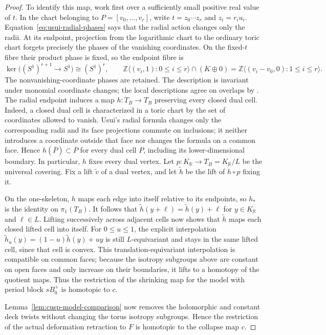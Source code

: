 \begin{proof}
To identify this map, work first over a sufficiently small positive real
value of $t$.  In the chart belonging to
$P=[v_0,\ldots,v_r]$, write $t=z_0\cdots z_r$ and
$z_i=r_iu_i$.  Equation~\eqref{eq:usui-radial-phases} says that the
radial action changes only the radii.  At its endpoint, projection from the
logarithmic chart to the ordinary toric chart forgets precisely the phases
of the vanishing coordinates.  On the fixed-$t$ fibre their product phase
is fixed, so the endpoint fibre is
\[
 \ker\bigl((S^1)^{r+1}\longrightarrow S^1\bigr)\cong(S^1)^r,
 \qquad
 \mathbb Z\langle(v_i,1):0\leq i\leq r\rangle\cap(K\oplus0)
 =\mathbb Z\langle(v_i-v_0,0):1\leq i\leq r\rangle.
\]
The nonvanishing-coordinate phases are retained.  The description is
invariant under monomial coordinate changes; the local descriptions agree on
overlaps by \citep[p.~30, Claim~2 following (5.2.12)]{Usui2001}.  The radial endpoint
induces a map
$h:T_B\to T_B$ preserving every closed dual cell.  Indeed, a closed dual
cell is characterized in a toric chart by the set of coordinates allowed to
vanish.  Usui's radial formula changes only the corresponding radii and its
face projections commute on inclusions; it neither introduces a coordinate
 outside that face nor changes the formula on a common face.  Hence
$h(\overline P)\subset\overline P$ for every dual cell $P$, including
its lower-dimensional boundary.  In particular, $h$ fixes every dual
vertex.  Let $p:K_{\mathbb R}\to T_B=K_{\mathbb R}/L$ be the universal
covering.  Fix a lift $\widetilde v$ of a dual vertex, and let $\widetilde h$
be the lift of $h\circ p$ fixing it.

On the one-skeleton, $h$
maps each edge into itself relative to its endpoints, so $h_*$ is the
identity on $\pi_1(T_B)$.  It follows that
$\widetilde h(y+\ell)=\widetilde h(y)+\ell$ for
$y\in K_{\mathbb R}$ and $\ell\in L$.
Lifting successively across adjacent cells now shows that
$\widetilde h$ maps each closed lifted cell into itself.
For $0\leq u\leq1$, the explicit interpolation
$\widetilde h_u(y)=(1-u)\widetilde h(y)+uy$
is still $L$-equivariant and stays in the same lifted cell, since that cell
is convex.  This translation-equivariant interpolation is compatible on common faces;
because the isotropy subgroups above are constant on open faces and only
increase on their boundaries, it lifts to a homotopy of the quotient maps.
Thus the restriction of the shrinking map for the model with period block
$sB_0^+$ is homotopic to $c$.

Lemma~\ref{lem:cusp-model-comparison} now removes the holomorphic and constant
deck twists without changing the torus isotropy subgroups.  Hence the
restriction of the actual deformation retraction to $F$ is homotopic to
the collapse map $c$.


\end{proof}
